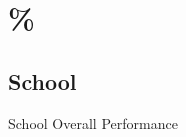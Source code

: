 \label{1.2.1 School Overall Performance}

\renewcommand{\insertschoolname}{Vivegaa School}
\renewcommand{\insertclass}{- Class [5, 6, 7, 8]}
\renewcommand{\insertsubject}{- Math \& Science \& English}

\section{\%}
\subsection{School}
\begin{frame}{School Overall Performance}
\scriptsize



\end{frame}
%

